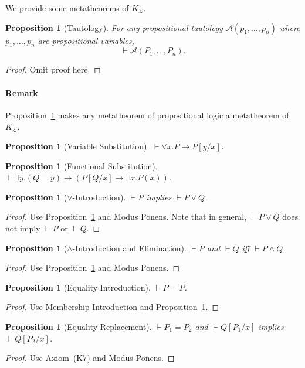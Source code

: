 \documentclass{article}
\theoremstyle{plain}
\newtheorem{prop}[thm]{Proposition}
\begin{document}
We provide some metatheorems of $K_\mathcal{L}$.

\begin{prop}[Tautology] \label{prop:taut}
	For any propositional tautology $\mathcal{A}(p_1,\dots,p_n)$ where $p_1,\dots,p_n$ are propositional variables, $$ \vdash \mathcal{A}(P_1,\dots,P_n).$$
\end{prop}
\begin{proof}
	Omit proof here.
\end{proof}
\paragraph{Remark} Proposition~\ref{prop:taut} makes any metatheorem of propositional logic a metatheorem of $K_\mathcal{L}$.
\begin{prop} [Variable Substitution]
	$\vdash \forall x . P \to P[y / x]$.
\end{prop}
\begin{prop}[Functional Substitution]
	$\vdash \exists y . (Q = y) \to (P[Q / x] \to \exists x . P(x))$.
\end{prop}
\begin{prop}[$\vee$-Introduction] \label{prop:vee-introduction}
	$\vdash P$ implies $\vdash P \vee Q$.
\end{prop}
\begin{proof}
Use Proposition~\ref{prop:taut} and Modus Ponens.
Note that in general, $\vdash P \vee Q$ does not imply $\vdash P$ or $\vdash Q$.
\end{proof}

\begin{prop}[$\wedge$-Introduction and Elimination]
\label{prop:wedge}
$\vdash P$ and $\vdash Q$ iff $\vdash P \wedge Q$.
\end{prop}
\begin{proof}
Use Proposition~\ref{prop:taut} and Modus Ponens.
\end{proof}

\begin{prop}[Equality Introduction]
	$\vdash P = P$.
\end{prop}
\begin{proof}
	Use Membership Introduction and Proposition~\ref{prop:taut}.
\end{proof}

\begin{prop}[Equality Replacement]
\label{prop:ereplacement}
$\vdash P_1 = P_2$ and $\vdash Q[P_1 / x]$ implies $\vdash Q[P_2 / x]$.
\end{prop}
\begin{proof}
	Use Axiom~(K7) and Modus Ponens.
\end{proof}
\end{document}
